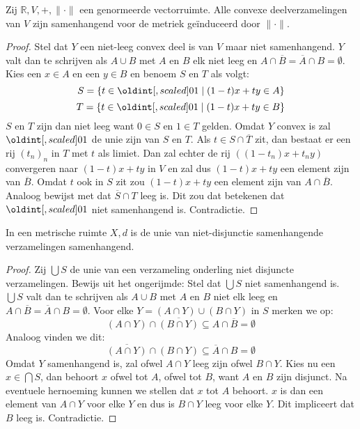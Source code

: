 \documentclass[main.tex]{subfiles}
\begin{document}
\begin{bpr}
  \label{pr:convexe-deelverzamelingen-samenhangend}
  Zij $\mathbb{R},V,+, \|\cdot\|$ een genormeerde vectorruimte.
  Alle convexe deelverzamelingen van $V$ zijn samenhangend voor de metriek ge\"induceerd door $\|\cdot\|$.

  \begin{proof}
    Stel dat $Y$ een niet-leeg convex deel is van $V$ maar niet samenhangend.
    $Y$ valt dan te schrijven als $A \cup B$ met $A$ en $B$ elk niet leeg en $A \cap \overline{B} = \overline{A} \cap B = \emptyset$.
    Kies een $x\in A$ en een $y\in B$ en benoem $S$ en $T$ als volgt:
    \[ S = \{ t\in \interval{0}{1} \mid (1-t)x + ty \in A \} \]
    \[ T = \{ t\in \interval{0}{1} \mid (1-t)x + ty \in B \} \]
    $S$ en $T$ zijn dan niet leeg want $0 \in S$ en $1 \in T$ gelden.
    Omdat $Y$ convex is zal $\interval{0}{1}$ de unie zijn van $S$ en $T$.
    Als $t\in S \cap \overline{T}$ zit, dan bestaat er een rij $(t_{n})_{n}$ in $T$ met $t$ als limiet.
    Dan zal echter de rij $\left((1-t_{n})x + t_{n}y\right)$ convergeren naar $(1-t)x + ty$ in $V$ en zal dus $(1-t)x+ty$ een element zijn van $\overline{B}$.
    Omdat $t$ ook in $S$ zit zou $(1-t)x+ty$ een element zijn van $A \cap \overline{B}$.
    Analoog bewijst met dat $\overline{S} \cap T$ leeg is.
    Dit zou dat betekenen dat $\interval{0}{1}$ niet samenhangend is.
    Contradictie.
  \end{proof}
\end{bpr}

\begin{bpr}
  \label{pr:niet-disjunctie-samenhangende-unie-samenhangend}
  In een metrische ruimte $X,d$ is de unie van niet-disjunctie samenhangende verzamelingen samenhangend.

  \begin{proof}
    Zij $\bigcup S$ de unie van een verzameling onderling niet disjuncte verzamelingen.
    Bewijs uit het ongerijmde: Stel dat $\bigcup S$ niet samenhangend is.\\
    $\bigcup S$ valt dan te schrijven als $A \cup B$ met $A$ en $B$ niet elk leeg en $A \cap \overline{B} = \overline{A} \cap B = \emptyset$.
    Voor elke $Y = (A \cap Y) \cup (B \cap Y)$ in $S$ merken we op: 
    \[ (A \cap Y) \cap \overline{(B \cap Y)} \subseteq A \cap \overline{B} = \emptyset \]
    Analoog vinden we dit:
    \[ \overline{(A \cap Y)} \cap (B \cap Y) \subseteq \overline{A} \cap B = \emptyset \]
    Omdat $Y$ samenhangend is, zal ofwel $A \cap Y$ leeg zijn ofwel $B \cap Y$.
    Kies nu een $x\in \bigcap S$, dan behoort $x$ ofwel tot $A$, ofwel tot $B$, want $A$ en $B$ zijn disjunct.
    Na eventuele hernoeming kunnen we stellen dat $x$ tot $A$ behoort.
    $x$ is dan een element van $A \cap Y$ voor elke $Y$ en dus is $B \cap Y$ leeg voor elke $Y$.
    Dit impliceert dat $B$ leeg is.
    Contradictie.
  \end{proof}
\end{bpr}
\end{document}
